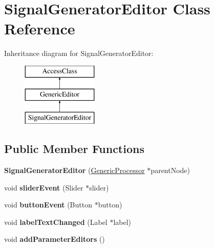 \hypertarget{classSignalGeneratorEditor}{\section{Signal\-Generator\-Editor Class Reference}
\label{classSignalGeneratorEditor}
}
Inheritance diagram for Signal\-Generator\-Editor\-:\begin{figure}[H]
\begin{center}
\leavevmode
\includegraphics[height=3.000000cm]{classSignalGeneratorEditor}
\end{center}
\end{figure}
\subsection*{Public Member Functions}
\begin{DoxyCompactItemize}
\item 
\hypertarget{classSignalGeneratorEditor_aac0fcfad0aaefec4768919f0e7f1eebb}{{\bfseries Signal\-Generator\-Editor} (\hyperlink{classGenericProcessor}{Generic\-Processor} $\ast$parent\-Node)}\label{classSignalGeneratorEditor_aac0fcfad0aaefec4768919f0e7f1eebb}

\item 
\hypertarget{classSignalGeneratorEditor_a73b886e45b124f62f6bd4b9eafb551b6}{void {\bfseries slider\-Event} (Slider $\ast$slider)}\label{classSignalGeneratorEditor_a73b886e45b124f62f6bd4b9eafb551b6}

\item 
\hypertarget{classSignalGeneratorEditor_a6d9ab33c5fbc544e442e5d30838bd9cd}{void {\bfseries button\-Event} (Button $\ast$button)}\label{classSignalGeneratorEditor_a6d9ab33c5fbc544e442e5d30838bd9cd}

\item 
\hypertarget{classSignalGeneratorEditor_ac06bf3a2d62e274605e65a60edaa72bc}{void {\bfseries label\-Text\-Changed} (Label $\ast$label)}\label{classSignalGeneratorEditor_ac06bf3a2d62e274605e65a60edaa72bc}

\item 
\hypertarget{classSignalGeneratorEditor_a68b95539ae3f0ebf6a900196a3070236}{void {\bfseries add\-Parameter\-Editors} ()}\label{classSignalGeneratorEditor_a68b95539ae3f0ebf6a900196a3070236}

\end{DoxyCompactItemize}
